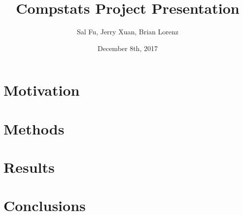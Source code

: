 \documentclass[t]{beamer}
\title{Compstats Project Presentation}
\author{Sal Fu, Jerry Xuan, Brian Lorenz}
\date{December 8th, 2017}
\begin{document}
\frame{\titlepage}

\section{Motivation}

\begin{frame}
\end{frame}

\begin{frame}
\end{frame}

\section{Methods}

\section{Results}

\section{Conclusions}
\end{document}
